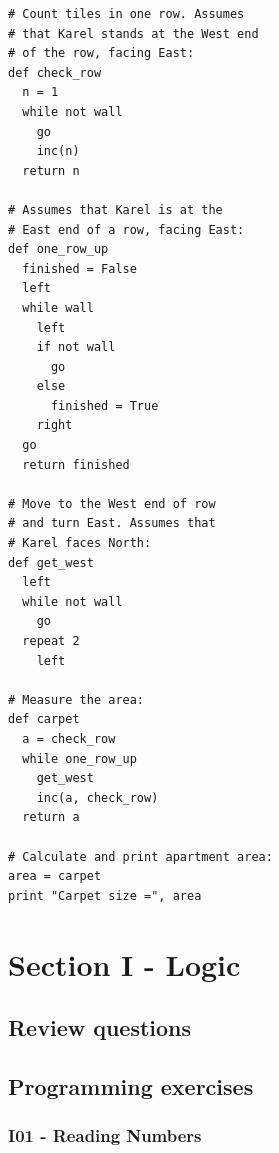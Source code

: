 \documentclass[article,A4,12pt]{llncs}
\begin{document}
\begin{verbatim}
# Count tiles in one row. Assumes
# that Karel stands at the West end 
# of the row, facing East: 
def check_row
  n = 1
  while not wall
    go 
    inc(n)
  return n
  
# Assumes that Karel is at the 
# East end of a row, facing East:
def one_row_up
  finished = False
  left
  while wall
    left
    if not wall 
      go
    else 
      finished = True 
    right
  go
  return finished

# Move to the West end of row 
# and turn East. Assumes that 
# Karel faces North:
def get_west
  left
  while not wall
    go
  repeat 2
    left
  
# Measure the area:
def carpet
  a = check_row
  while one_row_up
    get_west
    inc(a, check_row)
  return a
  
# Calculate and print apartment area:
area = carpet
print "Carpet size =", area
\end{verbatim}


\section{Section I - Logic}

\subsection{Review questions}

\subsection{Programming exercises}

\subsubsection{I01 - Reading Numbers}
\end{document}
